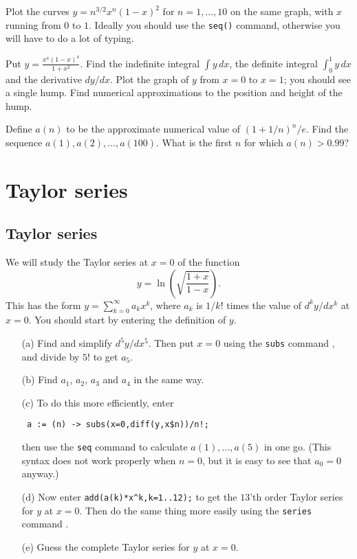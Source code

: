 \documentclass[a4paper,10pt]{amsbook}
\numberwithin{example}{chapter}
\begin{document}
\begin{exercise}
 Plot the curves $y=n^{3/2}x^n(1-x)^2$ for $n=1,\dotsc,10$ on the same
 graph, with $x$ running from $0$ to $1$.  Ideally you should use the
 \verb~seq()~ command, otherwise you will have to do a lot of typing.
\end{exercise}

\begin{exercise}
 Put $\displaystyle y=\frac{x^4(1-x)^4}{1+x^2}$.  Find the
 indefinite integral $\int y\,dx$, the definite integral
 $\int_0^1 y\,dx$ and the derivative $dy/dx$.  Plot the
 graph of $y$ from $x=0$ to $x=1$; you should see a single
 hump.  Find numerical approximations to the position and
 height of the hump.
\end{exercise}

\begin{exercise}
 Define $a(n)$ to be the approximate numerical value of
 $(1+1/n)^n/e$.  Find the sequence
 $a(1),a(2),\dotsc,a(100)$.  What is the first $n$ for which
 $a(n)>0.99$? 
\end{exercise}

\chapter{Taylor series}

\section{Taylor series}\label{sec-taylor}

\begin{exercise}\label{ex-ln}
 We will study the Taylor series at $x=0$ of the function 
 \[ y = \ln\left(\sqrt{\frac{1+x}{1-x}}\right).  \]
 This has the form $y=\sum_{k=0}^\infty a_kx^k$, where $a_k$
 is $1/k!$ times the value of $d^ky/dx^k$ at $x=0$.  You
 should start by entering the definition of $y$.
 \begin{itemize}
  \item[(a)] Find \note{\NOTEmultidiff} and simplify
   $d^5y/dx^5$.  Then put $x=0$ using the \verb~subs~
   command \note{\NOTEsubs}, and divide by $5!$ to get $a_5$.
  \item[(b)] Find $a_1$, $a_2$, $a_3$ and $a_4$ in the
   same way.
  \item[(c)] To do this more efficiently, enter 
\begin{verbatim}
 a := (n) -> subs(x=0,diff(y,x$n))/n!;
\end{verbatim}
   then use the \verb~seq~ command \note{\NOTEseq} to
   calculate $a(1),\dotsc,a(5)$ in one go.  (This syntax does not
   work properly when $n=0$, but it is easy to see that
   $a_0=0$ anyway.)
  \item[(d)] Now enter \verb~add(a(k)*x^k,k=1..12);~ to get
   the $13$'th order Taylor series for $y$ at $x=0$.  Then do the
   same thing more easily using the \verb~series~ command
   \note{\NOTEtaylor}. 
  \item[(e)] Guess the complete Taylor series for $y$ at $x=0$.
 \end{itemize}
\end{exercise}
\end{document}
